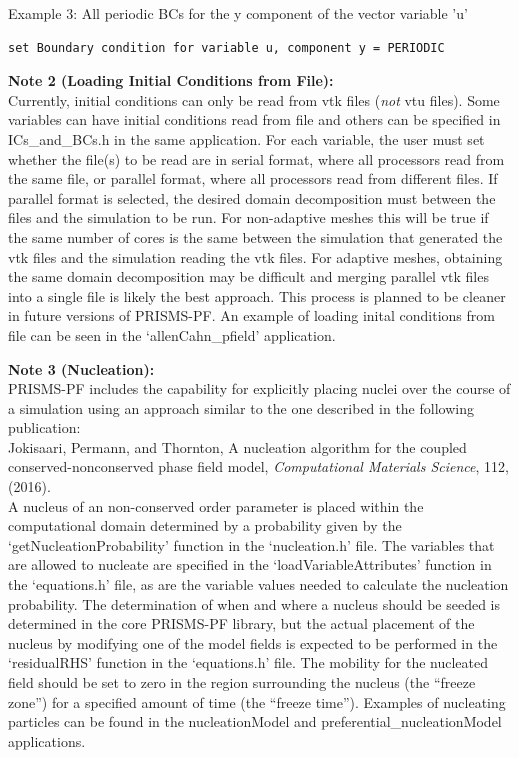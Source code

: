 \documentclass[10pt]{article} %
\begin{document}
Example 3: All periodic BCs for the y component of the vector variable 'u'
\begin{lstlisting}
set Boundary condition for variable u, component y = PERIODIC
\end{lstlisting}

\textbf{Note 2 (Loading Initial Conditions from File):} \\
Currently, initial conditions can only be read from vtk files (\emph{not} vtu files). Some variables can have initial conditions read from file and others can be specified in ICs\_and\_BCs.h in the same application. For each variable, the user must set whether the file(s) to be read are in serial format, where all processors read from the same file, or parallel format, where all processors read from different files. If parallel format is selected, the desired domain decomposition must between the files and the simulation to be run. For non-adaptive meshes this will be true if the same number of cores is the same between the simulation that generated the vtk files and the simulation reading the vtk files. For adaptive meshes, obtaining the same domain decomposition may be difficult and merging parallel vtk files into a single file is likely the best approach. This process is planned to be cleaner in future versions of PRISMS-PF. An example of loading inital conditions from file can be seen in the `allenCahn\_pfield' application.

\textbf{Note 3 (Nucleation):} \\
PRISMS-PF includes the capability for explicitly placing nuclei over the course of a simulation using an approach similar to the one described in the following publication: \\
Jokisaari, Permann, and Thornton, A nucleation algorithm for the coupled conserved-nonconserved phase field model, \emph{Computational Materials Science}, 112, (2016). \\
A nucleus of an non-conserved order parameter is placed within the computational domain determined by a probability given by the `getNucleationProbability' function in the `nucleation.h' file. The variables that are allowed to nucleate are specified in the `loadVariableAttributes' function in the `equations.h' file, as are the variable values needed to calculate the nucleation probability. The determination of when and where a nucleus should be seeded is determined in the core PRISMS-PF library, but the actual placement of the nucleus by modifying one of the model fields is expected to be performed in the `residualRHS' function in the `equations.h' file. The mobility for the nucleated field should be set to zero in the region surrounding the nucleus (the ``freeze zone'') for a specified amount of time (the ``freeze time''). Examples of nucleating particles can be found in the nucleationModel and preferential\_nucleationModel applications.
\end{document}
